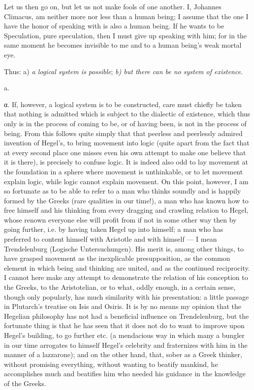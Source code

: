 \documentclass[12pt,a4paper,openany]{book}
\newcommand{\opage}[1]{\marginnote{\footnotesize\textit{[#1]}}}
\begin{document}
Let us then go on, but let us not make fools of one another. I, Johannes Climacus,
am neither more nor less than a human being; I assume that the one I have the honor
of speaking with is also a human being. If he wants to be Speculation, pure
speculation, then I must give up speaking with him; for in the same moment he
becomes invisible to me and to a human being's weak mortal eye.

Thus: a) \emph{a logical system is possible};
\emph{b) but there can be no system of
existence}.

\begin{center}a.\end{center}

α. If, however, a logical system is to be constructed, care must chiefly be taken
that nothing is admitted which is subject to the dialectic of existence, which thus
only is in the process of coming to be, or of having been, is not in the process of
being. From this
\setcounter{footnote}{0}%
\opage{171}follows quite simply that that peerless and peerlessly admired invention of Hegel's,
to bring movement into logic (quite apart from the fact that at every second place
one misses even his own attempt to make one believe that it is there), is precisely
to confuse logic. It is indeed also odd to lay movement at the foundation in a sphere
where movement is unthinkable, or to let movement explain logic, while logic cannot
explain movement. On this point, however, I am so fortunate as to be able to refer to
a man who thinks soundly and is happily formed by the Greeks (rare qualities in our
time!), a man who has known how to free himself and his thinking from every dragging
and crawling relation to Hegel, whose renown everyone else will profit from if not in
some other way then by going further, i.e. by having taken Hegel up into himself; a
man who has preferred to content himself with Aristotle and with himself --- I mean
Trendelenburg (Logische Untersuchungen). His merit is, among other things, to have
grasped movement as the inexplicable presupposition, as the common element in which
being and thinking are united, and as the continued reciprocity. I cannot here make
any attempt to demonstrate the relation of his conception to the Greeks, to the
Aristotelian, or to what, oddly enough, in a certain sense, though only popularly, has
much similarity with his presentation: a little passage in Plutarch's treatise on
Isis and Osiris. It is by no means my opinion that the Hegelian philosophy has not had
a beneficial influence on Trendelenburg, but the fortunate thing is that he has seen
that it does not do to want to improve upon Hegel's building, to go further etc. (a
mendacious way in which many a bungler in our time arrogates to himself Hegel's
celebrity and fraternizes with him in the manner of a lazzarone); and on the other
hand, that, sober as a Greek thinker, without promising everything, without wanting to
beatify mankind, he accomplishes much and beatifies him who needed his guidance in
the knowledge of the Greeks.
\end{document}
